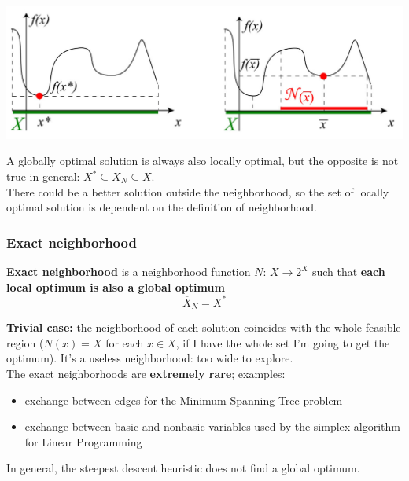 \begin{center}
	\includegraphics[width=\columnwidth]{img/localOptimum}
\end{center}

A globally optimal solution is always also locally optimal, but the opposite is not true in general: $X^\ast \subseteq \overline{X}_N \subseteq X$.\\

There could be a better solution outside the neighborhood, so the set of locally optimal solution is dependent on the definition of neighborhood.\\

\newpage

\subsubsection{Exact neighborhood}

\textbf{Exact neighborhood} is a neighborhood function $N : \, X \rightarrow 2^X$ such that \textbf{each local optimum is also a global optimum}
$$ \overline{X}_N = X^\ast $$

\textbf{Trivial case:} the neighborhood of each solution coincides with the whole feasible region ($N (x) = X$ for each $x \in X$, if I have the whole set I'm going to get the optimum). It's a useless neighborhood: too wide to explore.\\

The exact neighborhoods are \textbf{extremely rare}; examples: 
\begin{itemize}
	\item exchange between edges for the Minimum Spanning Tree problem
	
	\item exchange between basic and nonbasic variables used by the simplex algorithm for Linear Programming
\end{itemize}

In general, the steepest descent heuristic does not find a global optimum.\\

